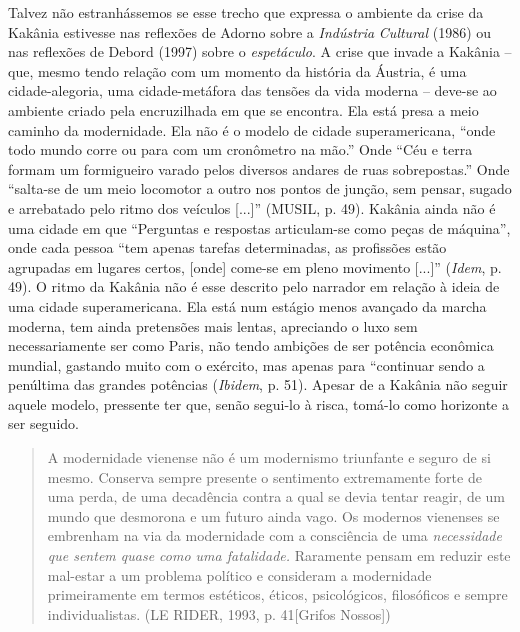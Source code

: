 Talvez não estranhássemos se esse trecho que expressa o ambiente da
crise da Kakânia estivesse nas reflexões de Adorno sobre a
\emph{Indústria} \emph{Cultural} (1986) ou nas reflexões de Debord
(1997) sobre o \emph{espetáculo}. A crise que invade a Kakânia -- que,
mesmo tendo relação com um momento da história da Áustria, é uma
cidade-alegoria, uma cidade-metáfora das tensões da vida moderna --
deve-se ao ambiente criado pela encruzilhada em que se encontra. Ela
está presa a meio caminho da modernidade. Ela não é o modelo de cidade
superamericana, ``onde todo mundo corre ou para com um cronômetro na
mão.'' Onde ``Céu e terra formam um formigueiro varado pelos diversos
andares de ruas sobrepostas.'' Onde ``salta-se de um meio locomotor a
outro nos pontos de junção, sem pensar, sugado e arrebatado pelo ritmo
dos veículos {[}...{]}'' (MUSIL, p. 49). Kakânia ainda não é uma cidade
em que ``Perguntas e respostas articulam-se como peças de máquina'',
onde cada pessoa ``tem apenas tarefas determinadas, as profissões estão
agrupadas em lugares certos, {[}onde{]} come-se em pleno movimento
{[}...{]}'' (\emph{Idem}, p. 49). O ritmo da Kakânia não é esse descrito
pelo narrador em relação à ideia de uma cidade superamericana. Ela está
num estágio menos avançado da marcha moderna, tem ainda pretensões mais
lentas, apreciando o luxo sem necessariamente ser como Paris, não tendo
ambições de ser potência econômica mundial, gastando muito com o
exército, mas apenas para ``continuar sendo a penúltima das grandes
potências (\emph{Ibidem}, p. 51). Apesar de a Kakânia não seguir aquele
modelo, pressente ter que, senão segui-lo à risca, tomá-lo como
horizonte a ser seguido.

\begin{quote}
A modernidade vienense não é um modernismo triunfante e seguro de si
mesmo. Conserva sempre presente o sentimento extremamente forte de uma
perda, de uma decadência contra a qual se devia tentar reagir, de um
mundo que desmorona e um futuro ainda vago. Os modernos vienenses se
embrenham na via da modernidade com a consciência de uma
\emph{necessidade que sentem quase como uma fatalidade.} Raramente
pensam em reduzir este mal-estar a um problema político e consideram a
modernidade primeiramente em termos estéticos, éticos, psicológicos,
filosóficos e sempre individualistas. (LE RIDER, 1993, p. 41{[}Grifos
Nossos{]})
\end{quote}


